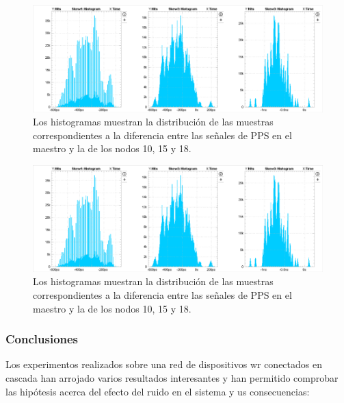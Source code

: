 \begin{figure}
	\centering
	\includegraphics[width=0.7\linewidth]{imagenes/hist_exp3}
	\caption[Histograma para cadena de 15 WR-LEN]{Los histogramas muestran la 
		distribución de las muestras correspondientes a la diferencia entre las 
		señales de PPS en el maestro y la de los nodos 10, 15 y 18.}
	\label{fig:histexp2}
\end{figure}

\begin{figure}
	\centering
	\includegraphics[width=0.7\linewidth]{imagenes/hist_exp3}
	\caption[Histograma para cadena de 15 WR-LEN con un enlace de 5km]{Los 
	histogramas muestran la distribución de las muestras correspondientes a la 
	diferencia entre las señales de PPS en el maestro y la de los nodos 10, 15 
	y 18.}
	\label{fig:histexp3}
\end{figure}

\subsubsection{Conclusiones}

Los experimentos realizados sobre una red de dispositivos \gls{wr} conectados 
en cascada han arrojado varios resultados interesantes y han permitido 
comprobar las hipótesis acerca del efecto del ruido en el sistema y us 
consecuencias:

